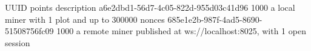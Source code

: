 \begin{shellbox}\begin{ttlst}
                UUID                 points                               description                             
a6e2dbd1-56d7-4c05-822d-955d03c41d96   1000   a local miner with 1 plot and up to 300000 nonces                   
685e1e2b-987f-4ad5-8690-51508756fc09   1000   a remote miner published at ws://localhost:8025, with 1 open session
\end{ttlst}\end{shellbox}
